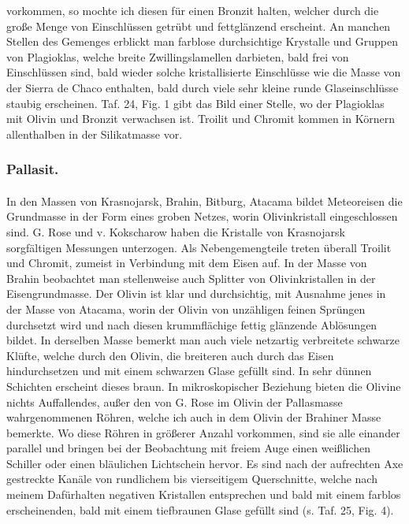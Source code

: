 \documentclass[a4paper, 12pt, oneside]{article}
\begin{document}
vorkommen, so mochte ich diesen für einen Bronzit halten, welcher durch die große Menge von Einschlüssen getrübt und fettglänzend erscheint. An manchen Stellen des Gemenges erblickt man farblose durchsichtige Krystalle und Gruppen von Plagioklas, welche breite Zwillingslamellen darbieten, bald frei von Einschlüssen sind, bald wieder solche kristallisierte Einschlüsse wie die Masse von der Sierra de Chaco enthalten, bald durch viele sehr kleine runde Glaseinschlüsse staubig erscheinen. Taf. 24, Fig. 1 gibt das Bild einer Stelle, wo der Plagioklas mit Olivin und Bronzit verwachsen ist. Troilit und Chromit kommen in Körnern allenthalben in der Silikatmasse vor.

\subsubsection{Pallasit.}
\paragraph{}
In den Massen von Krasnojarsk, Brahin, Bitburg, Atacama bildet Meteoreisen die Grundmasse in der Form eines groben Netzes, worin Olivinkristall eingeschlossen sind. G. Rose und v. Kokscharow haben die Kristalle von Krasnojarsk sorgfältigen Messungen unterzogen. Als Nebengemengteile treten überall Troilit und Chromit, zumeist in Verbindung mit dem Eisen auf. In der Masse von Brahin beobachtet man stellenweise auch Splitter von Olivinkristallen in der Eisengrundmasse. Der Olivin ist klar und durchsichtig, mit Ausnahme jenes in der Masse von Atacama, worin der Olivin von unzähligen feinen Sprüngen durchsetzt wird und nach diesen krummflächige fettig glänzende Ablösungen bildet. In derselben Masse bemerkt man auch viele netzartig verbreitete schwarze Klüfte, welche durch den Olivin, die breiteren auch durch das Eisen hindurchsetzen und mit einem schwarzen Glase gefüllt sind. In sehr dünnen Schichten erscheint dieses braun. In mikroskopischer Beziehung bieten die Olivine nichts Auffallendes, außer den von G. Rose im Olivin der Pallasmasse wahrgenommenen Röhren, welche ich auch in dem Olivin der Brahiner Masse bemerkte. Wo diese Röhren in größerer Anzahl vorkommen, sind sie alle einander parallel und bringen bei der Beobachtung mit freiem Auge einen weißlichen Schiller oder einen bläulichen Lichtschein hervor. Es sind nach der aufrechten Axe gestreckte Kanäle von rundlichem bis vierseitigem Querschnitte, welche nach meinem Dafürhalten negativen Kristallen entsprechen und bald mit einem farblos erscheinenden, bald mit einem tiefbraunen Glase gefüllt sind (s. Taf. 25, Fig. 4).
\clearpage
\end{document}
